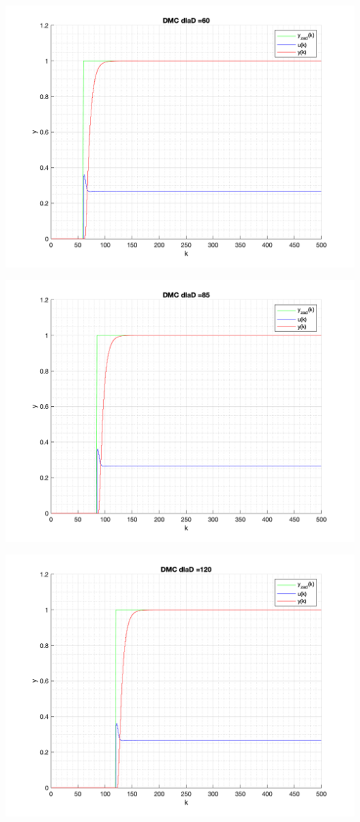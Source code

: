 \documentclass[a4paper, 11pt]{article}
\begin{document}
\begin{enumerate}
 \includegraphics[width=\linewidth]{./ModelsP4_D/P4_DMC_D_60_png.png} 
 
 \includegraphics[width=\linewidth]{./ModelsP4_D/P4_DMC_D_85_png.png} 
 
 \includegraphics[width=\linewidth]{./ModelsP4_D/P4_DMC_D_120_png.png} 
 

\end{enumerate}
\end{document}

